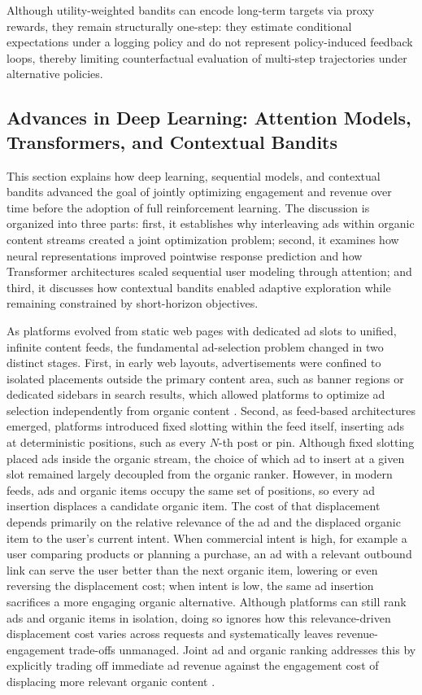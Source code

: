 \documentclass[manuscript,review,screen]{acmart}
\begin{document}
Although utility-weighted bandits can encode long-term targets via proxy rewards, they remain structurally one-step: they estimate conditional expectations under a logging policy and do not represent policy-induced feedback loops, thereby limiting counterfactual evaluation of multi-step trajectories under alternative policies.

\subsection{Advances in Deep Learning: Attention Models, Transformers, and Contextual Bandits}

This section explains how deep learning, sequential models, and contextual bandits advanced the goal of jointly optimizing engagement and revenue over time before the adoption of full reinforcement learning. The discussion is organized into three parts: first, it establishes why interleaving ads within organic content streams created a joint optimization problem; second, it examines how neural representations improved pointwise response prediction and how Transformer architectures scaled sequential user modeling through attention; and third, it discusses how contextual bandits enabled adaptive exploration while remaining constrained by short-horizon objectives.

As platforms evolved from static web pages with dedicated ad slots to unified, infinite content feeds, the fundamental ad-selection problem changed in two distinct stages. First, in early web layouts, advertisements were confined to isolated placements outside the primary content area, such as banner regions or dedicated sidebars in search results, which allowed platforms to optimize ad selection independently from organic content \cite{zhang2018whole}. Second, as feed-based architectures emerged, platforms introduced fixed slotting within the feed itself, inserting ads at deterministic positions, such as every $N$-th post or pin. Although fixed slotting placed ads inside the organic stream, the choice of which ad to insert at a given slot remained largely decoupled from the organic ranker. However, in modern feeds, ads and organic items occupy the same set of positions, so every ad insertion displaces a candidate organic item. The cost of that displacement depends primarily on the relative relevance of the ad and the displaced organic item to the user's current intent. When commercial intent is high, for example a user comparing products or planning a purchase, an ad with a relevant outbound link can serve the user better than the next organic item, lowering or even reversing the displacement cost; when intent is low, the same ad insertion sacrifices a more engaging organic alternative. Although platforms can still rank ads and organic items in isolation, doing so ignores how this relevance-driven displacement cost varies across requests and systematically leaves revenue-engagement trade-offs unmanaged. Joint ad and organic ranking addresses this by explicitly trading off immediate ad revenue against the engagement cost of displacing more relevant organic content \cite{zhao2020jointly, yan2020ads}. 
\end{document}
